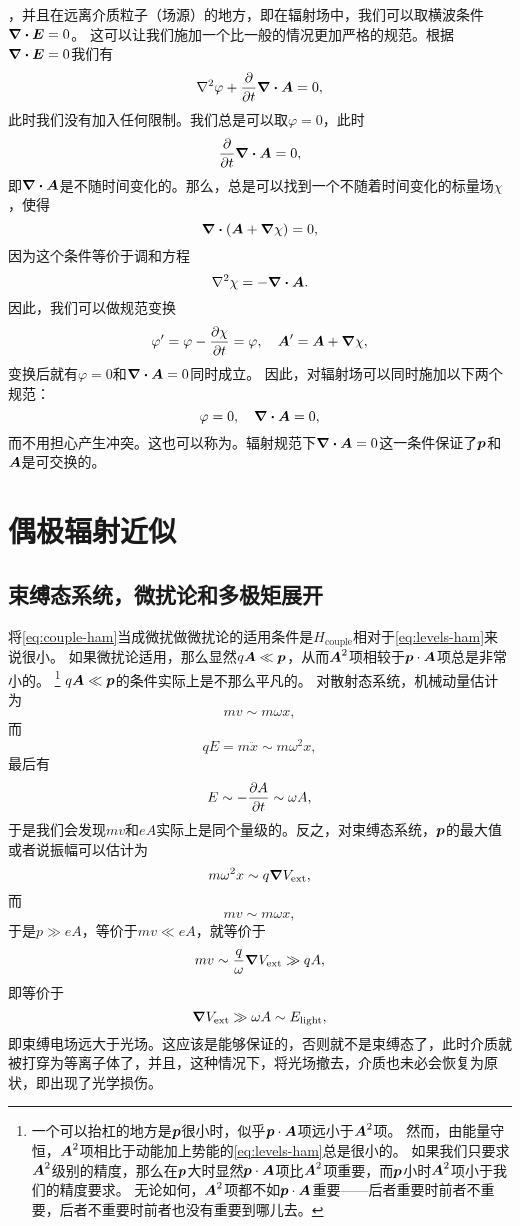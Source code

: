 ，并且在远离介质粒子（场源）的地方，即在辐射场中，我们可以取横波条件$\div{\vb*{E}}=0$。
这可以让我们施加一个比一般的情况更加严格的规范。根据$\div{\vb*{E}}=0$我们有
\[
    \laplacian{\varphi} + \pdv{t} \div{\vb*{A}} = 0,
\]
此时我们没有加入任何限制。我们总是可以取$\varphi=0$，此时
\[
    \pdv{t} \div{\vb*{A}} = 0,
\]
即$\div{\vb*{A}}$是不随时间变化的。那么，总是可以找到一个不随着时间变化的标量场$\chi$，使得
\[
    \div{(\vb*{A} + \grad{\chi})} = 0,
\]
因为这个条件等价于调和方程
\[
    \laplacian{\chi} = - \div{\vb*{A}}.
\]
因此，我们可以做规范变换
\[
    \varphi' = \varphi - \pdv{\chi}{t} = \varphi, \quad \vb*{A}' = \vb*{A} + \grad{\chi},
\]
变换后就有$\varphi=0$和$\div{\vb*{A}}=0$同时成立。
因此，对辐射场可以同时施加以下两个规范：
\begin{equation}
    \varphi = 0, \quad \div{\vb*{A}} = 0,
\end{equation}
而不用担心产生冲突。这也可以称为。辐射规范下$\div{\vb*{A}}=0$这一条件保证了$\vb*{p}$和$\vb*{A}$是可交换的。

\section{偶极辐射近似}\label{sec:dipole-radiation}

\subsection{束缚态系统，微扰论和多极矩展开}\label{sec:multipole}

将\eqref{eq:couple-ham}当成微扰做微扰论的适用条件是$H_\text{couple}$相对于\eqref{eq:levels-ham}来说很小。
如果微扰论适用，那么显然$q \vb*{A} \ll \vb*{p}$，从而$\vb*{A}^2$项相较于$\vb*{p} \cdot \vb*{A}$项总是非常小的。%
\footnote{
    一个可以抬杠的地方是$\vb*{p}$很小时，似乎$\vb*{p} \cdot \vb*{A}$项远小于$\vb*{A}^2$项。
    然而，由能量守恒，$\vb*{A}^2$项相比于动能加上势能的\eqref{eq:levels-ham}总是很小的。
    如果我们只要求$\vb*{A}^2$级别的精度，那么在$\vb*{p}$大时显然$\vb*{p} \cdot \vb*{A}$项比$\vb*{A}^2$项重要，而$\vb*{p}$小时$\vb*{A}^2$项小于我们的精度要求。
    无论如何，$\vb*{A}^2$项都不如$\vb*{p} \cdot \vb*{A}$重要——后者重要时前者不重要，后者不重要时前者也没有重要到哪儿去。
}%
$q \vb*{A} \ll \vb*{p}$的条件实际上是不那么平凡的。
对散射态系统，机械动量估计为
\[
    m v \sim m \omega x,
\]
而
\[
    q E = m \ddot{x} \sim m \omega^2 x,
\]
最后有
\[
    E \sim - \pdv{A}{t} \sim \omega A,
\]
于是我们会发现$mv$和$eA$实际上是同个量级的。反之，对束缚态系统，$\vb*{p}$的最大值或者说振幅可以估计为
\[
    m \omega^2 x \sim q \grad{V_\text{ext}},
\]
而
\[
    mv \sim m \omega x,
\]
于是$p \gg eA$，等价于$mv \ll eA$，就等价于
\[
    mv \sim \frac{q}{\omega} \grad{V_\text{ext}} \gg q A,
\]
即等价于
\begin{equation}
    \grad{V_\text{ext}} \gg \omega A \sim E_\text{light},
\end{equation}
即束缚电场远大于光场。这应该是能够保证的，否则就不是束缚态了，此时介质就被打穿为等离子体了，并且，这种情况下，将光场撤去，介质也未必会恢复为原状，即出现了光学损伤。

